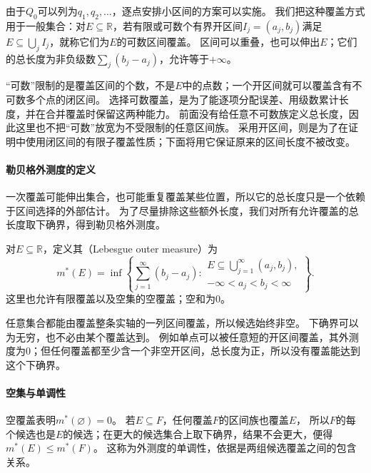 由于$Q_0$可以列为$q_1,q_2,\ldots$，逐点安排小区间的方案可以实施。
我们把这种覆盖方式用于一般集合：对$E\subseteq\mathbb R$，若有限或可数个有界开区间$I_j=(a_j,b_j)$满足$E\subseteq\bigcup_j I_j$，就称它们为$E$的可数区间覆盖。
区间可以重叠，也可以伸出$E$；它们的总长度为非负级数$\sum_j(b_j-a_j)$，允许等于$+\infty$。

“可数”限制的是覆盖区间的个数，不是$E$中的点数；一个开区间就可以覆盖含有不可数多个点的闭区间。
选择可数覆盖，是为了能逐项分配误差、用级数累计长度，并在合并覆盖时保留这两种能力。
前面没有给任意不可数族定义总长度，因此这里也不把“可数”放宽为不受限制的任意区间族。
采用开区间，则是为了在证明中使用闭区间的有限子覆盖性质；下面将用它保证原来的区间长度不被改变。

\paragraph{勒贝格外测度的定义}

一次覆盖可能伸出集合，也可能重复覆盖某些位置，所以它的总长度只是一个依赖于区间选择的外部估计。
为了尽量排除这些额外长度，我们对所有允许覆盖的总长度取下确界，得到勒贝格外测度。
\begin{definition}[勒贝格外测度]
\label{def:analysis-lebesgue-outer-measure}
对$E\subseteq\mathbb R$，定义其（Lebesgue outer measure）为
\begin{equation}
 m^*(E)=\inf\left\{\sum_{j=1}^{\infty}(b_j-a_j):
 \begin{array}{l}
 E\subseteq\bigcup_{j=1}^{\infty}(a_j,b_j),\\
 -\infty<a_j<b_j<\infty
 \end{array}\right\}.
 \label{eq:comb-lebesgue-outer-measure}
\end{equation}
这里也允许有限覆盖以及空集的空覆盖；空和为$0$。
\end{definition}

任意集合都能由覆盖整条实轴的一列区间覆盖，所以候选始终非空。
下确界可以为无穷，也不必由某个覆盖达到。
例如单点可以被任意短的开区间覆盖，其外测度为$0$；但任何覆盖都至少含一个非空开区间，总长度为正，所以没有覆盖能达到这个下确界。

\paragraph{空集与单调性}

空覆盖表明$m^*(\varnothing)=0$。
若$E\subseteq F$，任何覆盖$F$的区间族也覆盖$E$，
所以$F$的每个候选也是$E$的候选；在更大的候选集合上取下确界，结果不会更大，便得$m^*(E)\leq m^*(F)$。
这称为外测度的单调性，依据是两组候选覆盖之间的包含关系。

